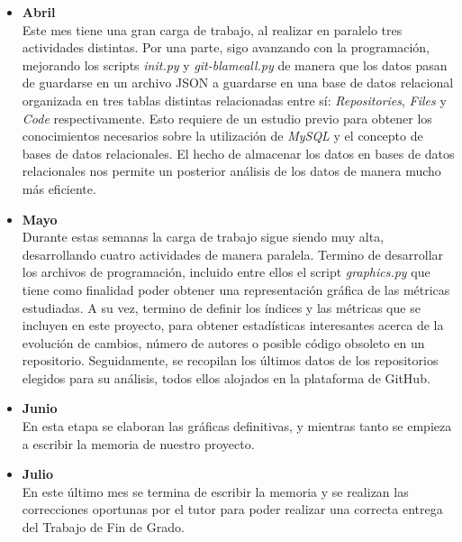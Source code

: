 \documentclass[a4paper, 12pt]{book}
\begin{document}
\begin{itemize}
  \item \textbf{Abril}
  \\Este mes tiene una gran carga de trabajo, al realizar en paralelo tres actividades distintas. Por una parte, sigo avanzando con la programación, mejorando los scripts \textit{init.py} y \textit{git-blameall.py}
  de manera que los datos pasan de guardarse en un archivo JSON a guardarse en una base de datos relacional organizada en tres tablas distintas relacionadas entre sí: \textit{Repositories}, \textit{Files} y \textit{Code} respectivamente.
  Esto requiere de un estudio previo para obtener los conocimientos necesarios sobre la utilización de \textit{MySQL} y el concepto de bases de datos relacionales. El hecho de almacenar los datos en bases de datos
  relacionales nos permite un posterior análisis de los datos de manera mucho más eficiente.

  \item \textbf{Mayo}
  \\Durante estas semanas la carga de trabajo sigue siendo muy alta, desarrollando cuatro actividades de manera paralela. Termino de desarrollar los archivos de programación, incluido entre ellos el script \textit{graphics.py}
  que tiene como finalidad poder obtener una representación gráfica de las métricas estudiadas. A su vez, termino de definir los índices y las métricas que se incluyen en este proyecto, para obtener estadísticas interesantes
  acerca de la evolución de cambios, número de autores o posible código obsoleto en un repositorio. Seguidamente, se recopilan los últimos datos de los repositorios elegidos para su análisis, todos ellos alojados en la plataforma
  de GitHub.

  \item \textbf{Junio}
  \\En esta etapa se elaboran las gráficas definitivas, y mientras tanto se empieza a escribir la memoria de nuestro proyecto.

  \item \textbf{Julio}
  \\En este último mes se termina de escribir la memoria y se realizan las correcciones oportunas por el tutor para poder realizar una correcta entrega del Trabajo de Fin de Grado.

\end{itemize}


\end{document}
